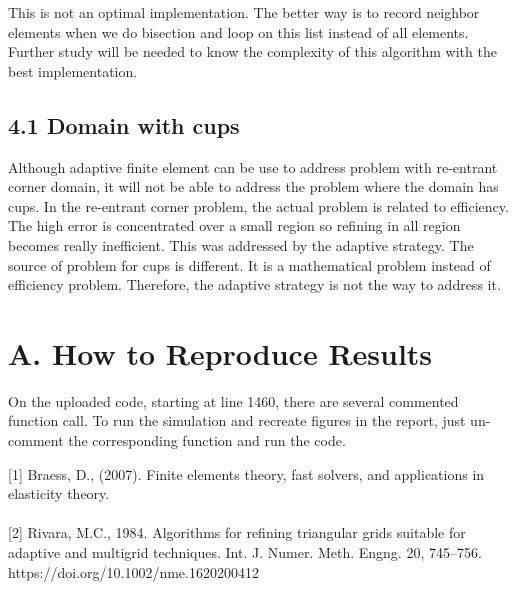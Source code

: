 \documentclass[11pt, letterpaper, hidelinks]{article}
\theoremstyle{definition}
\begin{document}
This is not an optimal implementation. The better way is to record neighbor elements when we do bisection and loop on this list instead of all elements. Further study will be needed to know the complexity of this algorithm with the best implementation.

\subsection{4.1 Domain with cups}

Although adaptive finite element can be use to address problem with re-entrant corner domain, it will not be able to address the problem where the domain has cups. In the re-entrant corner problem, the actual problem is related to efficiency. The high error is concentrated over a small region so refining in all region becomes really inefficient. This was addressed by the adaptive strategy. The source of problem for cups is different. It is a mathematical problem instead of efficiency problem. Therefore, the adaptive strategy is not the way to address it.

\section{A. How to Reproduce Results}
On the uploaded code, starting at line 1460, there are several commented function call. To run the simulation and recreate figures in the report, just un-comment the
corresponding function and run the code.

\begin{thebibliography}{2}

    [1] Braess, D., (2007). Finite elements theory, fast solvers, and applications in elasticity theory. \\ \\

    [2] Rivara, M.C., 1984. Algorithms for refining triangular grids suitable for adaptive and multigrid techniques. Int. J. Numer. Meth. Engng. 20, 745–756. https://doi.org/10.1002/nme.1620200412

\end{thebibliography}
\end{document}
